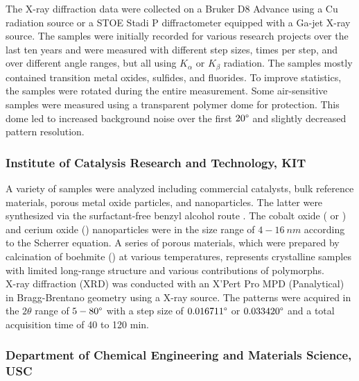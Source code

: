 The X-ray diffraction data were collected on a Bruker D8 Advance using a Cu radiation source or a STOE Stadi P diffractometer equipped with a Ga-jet X-ray source. The samples were initially recorded for various research projects over the last ten years and were measured with different step sizes, times per step, and over different angle ranges, but all using  $K_\alpha$ or  $K_\beta$ radiation. The samples mostly contained transition metal oxides, sulfides, and fluorides. To improve statistics, the samples were rotated during the entire measurement. Some air-sensitive samples were measured using a transparent polymer dome for protection. This dome led to increased background noise over the first $20\degree$ and slightly decreased pattern resolution. \\ 


\subsubsection*{Institute of Catalysis Research and Technology, KIT}

A variety of samples were analyzed including commercial catalysts, bulk reference materials, porous metal oxide particles, and nanoparticles. The latter were synthesized via the surfactant-free benzyl alcohol route \cite{Wolf2019, Wolf2018}. The cobalt oxide ( or ) and cerium oxide () nanoparticles were in the size range of $4-16 \ \si{nm}$ according to the Scherrer equation. A series of porous  materials, which were prepared by calcination of boehmite () at various temperatures, represents crystalline samples with limited long-range structure and various contributions of  polymorphs.\\

X-ray diffraction (XRD) was conducted with an X’Pert Pro MPD (Panalytical) in Bragg-Brentano geometry using a  X-ray source. The patterns were acquired in the $2\theta$ range of $5-80\degree$ with a step size of $0.016711\degree$ or $0.033420\degree$ and a total acquisition time of 40 to 120 min. \\

\subsubsection*{Department of Chemical Engineering and Materials Science, USC}

